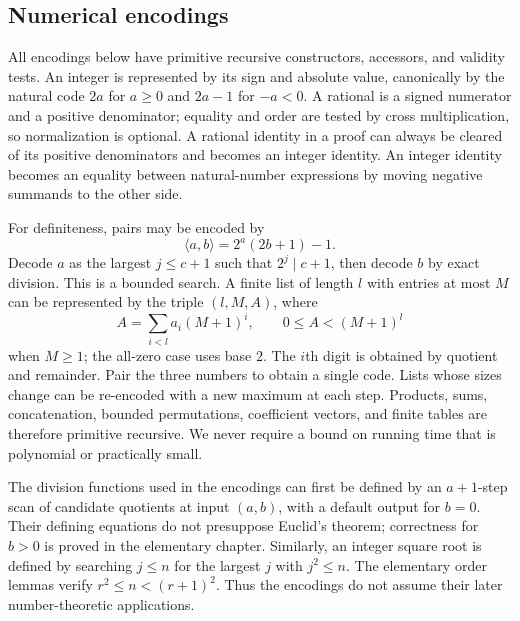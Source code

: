 \subsection{Numerical encodings}
All encodings below have primitive recursive constructors, accessors, and validity tests. An integer is represented by its sign and absolute value, canonically by the natural code $2a$ for $a\ge0$ and $2a-1$ for $-a<0$. A rational is a signed numerator and a positive denominator; equality and order are tested by cross multiplication, so normalization is optional. A rational identity in a proof can always be cleared of its positive denominators and becomes an integer identity. An integer identity becomes an equality between natural-number expressions by moving negative summands to the other side.

For definiteness, pairs may be encoded by
\[
 \langle a,b\rangle=2^a(2b+1)-1.
\]
Decode $a$ as the largest $j\le c+1$ such that $2^j\mid c+1$, then decode $b$ by exact division. This is a bounded search. A finite list of length $l$ with entries at most $M$ can be represented by the triple $(l,M,A)$, where
\[
 A=\sum_{i<l} a_i(M+1)^i,\qquad 0\le A<(M+1)^l
\]
when $M\ge1$; the all-zero case uses base $2$. The $i$th digit is obtained by quotient and remainder. Pair the three numbers to obtain a single code. Lists whose sizes change can be re-encoded with a new maximum at each step. Products, sums, concatenation, bounded permutations, coefficient vectors, and finite tables are therefore primitive recursive. We never require a bound on running time that is polynomial or practically small.

The division functions used in the encodings can first be defined by an $a+1$-step scan of candidate quotients at input $(a,b)$, with a default output for $b=0$. Their defining equations do not presuppose Euclid's theorem; correctness for $b>0$ is proved in the elementary chapter. Similarly, an integer square root is defined by searching $j\le n$ for the largest $j$ with $j^2\le n$. The elementary order lemmas verify $r^2\le n<(r+1)^2$. Thus the encodings do not assume their later number-theoretic applications.

